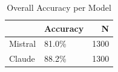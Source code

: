\begin{table}[h]
\caption{Overall Accuracy per Model}
\label{tab:overall_accuracy}
\begin{tabular}{llr}
\toprule
 & Accuracy & N \\
\midrule
Mistral & 81.0\% & 1300 \\
Claude & 88.2\% & 1300 \\
\bottomrule
\end{tabular}
\end{table}
